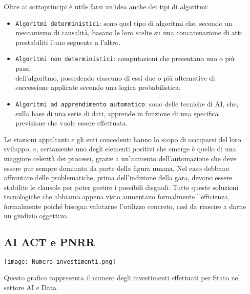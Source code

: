 \documentclass{article}
\begin{document}
\begin{justify}
\begin{itemize}
    \end{itemize}
    Oltre ai sottoprincipi è utile farsi un'idea anche dei tipi di algoritmi:
    \begin{itemize}
        \item \texttt{Algoritmi deterministici}: sono quel tipo di algoritmi che, secondo un meccanismo di causalità, basano le loro scelte su una concatenazione di atti prestabiliti l'uno seguente a l'altro.
        \item \texttt{Algoritmi non deterministici}: computazioni che presentano uno o più passi\\ dell'algoritmo, possedendo ciascuno di essi due o più alternative di successione applicate secondo una logica probabilistica.
        \item \texttt{Algoritmi ad apprendimento automatico}: sono delle tecniche di AI, che, sulla base di una serie di dati, apprende in funzione di una specifica previsione che vuole essere effettuata.
    \end{itemize}
    Le stazioni appaltanti e gli enti concedenti hanno lo scopo di occuparsi del loro sviluppo, e, certamente uno degli elementi positivi che emerge è quello di una maggiore celerità dei processi, grazie a un'aumento dell'automazione che deve essere pur sempre dominata da parte della figura umana. Nel caso debbano affrontare delle problematiche, prima dell'indizione della gara, devono essere stabilite le clausole per poter gestire i possibili disguidi.
    Tutte queste soluzioni tecnologiche che abbiamo appena visto aumentano formalmente l'efficienza, formalmente poiché bisogna valutarne l'utilizzo concreto, così da riuscire a darne un giudizio oggettivo.
\end{justify}

\subsection{AI ACT e PNRR}
\begin{center}
    \texttt{[image: Numero investimenti.png]}
\end{center}
\begin{center}
    Questo grafico rappresenta il numero degli investimenti effettuati per Stato nel settore AI e Data.\citep{OECD_AI}
\end{center}
\end{document}
